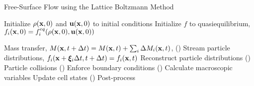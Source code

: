 \begin{algorithm}
\caption{Free-Surface Flow using the Lattice Boltzmann Method} \label{algo:free-surface-complete}
\begin{algorithmic}[1]
   
\Statex {}
\State Initialize $\rho(\mathbf{x}, 0)$ and $\mathbf{u}(\mathbf{x}, 0)$ to initial conditions
\State Initialize $f$ to quasiequilibrium, $f_i(\mathbf{x}, 0) = f_i^{eq}(\rho(\mathbf{x}, 0), \mathbf{u}(\mathbf{x}, 0))$

\Statex {}
\State Mass transfer, $M(\mathbf{x}, t + \Delta t) = M(\mathbf{x}, t) + \sum_i \Delta M_i(\mathbf{x}, t)$, ()
  \Statex {}
  \State Stream particle distributions, $f_i(\mathbf{x} + \boldsymbol{\xi}_i \Delta t, t + \Delta t) = f_i(\mathbf{x}, t)$ 
  \State Reconstruct particle distributions ()
  \State Particle collisions ()
  \State Enforce boundary conditions ()
  \State Calculate macroscopic variables
  \State Update cell states ()
\EndFor
\Statex
\State Post-process
\EndProcedure
\end{algorithmic}
\end{algorithm}
